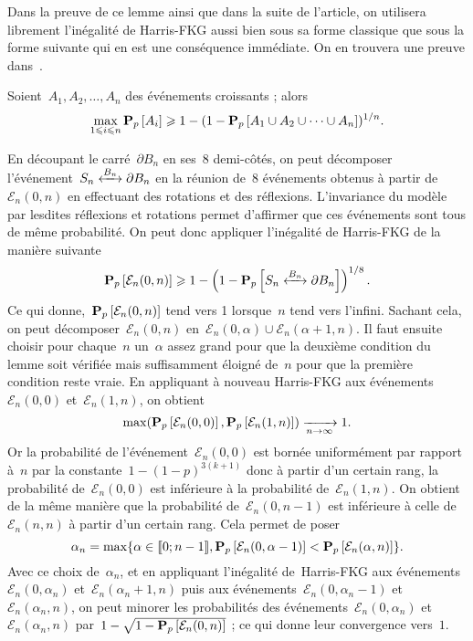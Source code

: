 	Dans la preuve de ce lemme ainsi que dans la suite de l'article, on utilisera librement l'inégalité de Harris-FKG aussi bien sous sa forme classique que sous la forme suivante qui en est une conséquence immédiate. On en trouvera une preuve dans~\cite{Grimmett}. 
	\begin{lem}\label{lem:HarrisFKG}
		Soient~$A_1, A_2, \ldots, A_n$ des événements croissants ; alors
		\[
			\max_{1 \leqslant i \leqslant n} \bm{\mathrm{P}}_{p}\left[A_i\right] \geqslant 1 - (1 - \bm{\mathrm{P}}_{p}\left[A_1 \cup A_2 \cup \cdots \cup A_n\right])^{1/n}. 
		\]
	\end{lem}
	
	\begin{dem}
		En découpant le carré~$\partial B_n$ en ses~$8$ demi-côtés, on peut décomposer l'événement~$\relie[B_n]{S_n}{\partial B_n}$ en la réunion de~$8$ événements obtenus à partir de~$\mathcal{E}_n(0, n)$ en effectuant des rotations et des réflexions. L'invariance du modèle par lesdites réflexions et rotations permet d'affirmer que ces événements sont tous de même probabilité. On peut donc appliquer l'inégalité de Harris-FKG de la manière suivante
		\[
			\Pp{\mathcal{E}_n(0,n)} \geq 1 - \left(1 - \Pp{\relie[B_n]{S_n}{\partial B_n}} \right)^{1/8}.
		\]
		Ce qui donne,~$\bm{\mathrm{P}}_{p}\left[\mathcal{E}_n(0, n)\right]$ tend vers 1 lorsque~$n$ tend vers l'infini. Sachant cela, on peut décomposer~$\mathcal{E}_n(0, n)$ en~$\mathcal{E}_n(0, \alpha) \cup \mathcal{E}_n(\alpha + 1, n)$. Il faut ensuite choisir pour chaque~$n$ un~$\alpha$ assez grand pour que la deuxième condition du lemme soit vérifiée mais suffisamment éloigné de~$n$ pour que la première condition reste vraie. En appliquant à nouveau Harris-FKG aux événements~$\mathcal{E}_n(0, 0)$ et~$\mathcal{E}_n(1, n)$, on obtient
		\[
			\max(\bm{\mathrm{P}}_{p}\left[\mathcal{E}_n(0, 0)\right], \bm{\mathrm{P}}_{p}\left[\mathcal{E}_n(1, n)\right]) \xrightarrow[n \to \infty]{} 1.
		\]
		Or la probabilité de l'événement~$\mathcal{E}_n(0,0)$ est bornée uniformément par rapport à~$n$ par la constante~$1 - (1-p)^{3(k+1)}$ donc à partir d'un certain rang, la probabilité de~$\mathcal{E}_n(0,0)$ est inférieure à la probabilité de~$\mathcal{E}_n(1, n)$. On obtient de la même manière que la probabilité de~$\mathcal{E}_n(0, n-1)$ est inférieure à celle de~$\mathcal{E}_n(n, n)$ à partir d'un certain rang. Cela permet de poser
		\[
			\alpha_n = \max \{ \alpha \in \llbracket 0;n-1 \rrbracket, \bm{\mathrm{P}}_{p}\left[\mathcal{E}_n(0, \alpha - 1)\right] < \bm{\mathrm{P}}_{p}\left[\mathcal{E}_n(\alpha, n)\right] \}.
		\]
		Avec ce choix de~$\alpha_n$, et en appliquant l'inégalité de~Harris-FKG aux événements~$\mathcal{E}_n(0, \alpha_n)$ et~$\mathcal{E}_n(\alpha_n + 1, n)$ puis aux événements~$\mathcal{E}_n(0, \alpha_n - 1)$ et~$\mathcal{E}_n(\alpha_n, n)$, on peut minorer les probabilités des événements~$\mathcal{E}_n(0, \alpha_n)$ et~$\mathcal{E}_n(\alpha_n, n)$ par~$1 - \sqrt{1  - \bm{\mathrm{P}}_{p}\left[\mathcal{E}_n(0, n)\right]}$ ; ce qui donne leur convergence vers~$1$. 


\end{dem}
